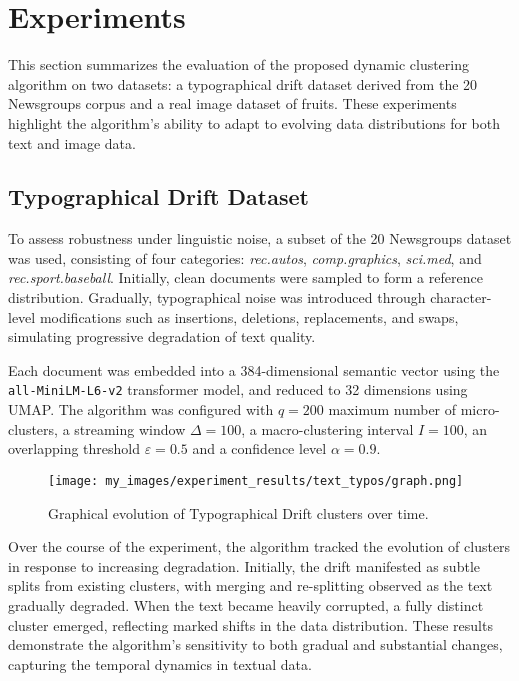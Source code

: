 \section{Experiments}\label{sec:experiments}

This section summarizes the evaluation of the proposed dynamic clustering
algorithm on two datasets: a typographical drift dataset derived from the 20
Newsgroups corpus and a real image dataset of fruits. These experiments
highlight the algorithm's ability to adapt to evolving data distributions for
both text and image data.

\subsection{Typographical Drift Dataset}\label{subsec:typographical_drift}

To assess robustness under linguistic noise, a subset of the 20 Newsgroups
dataset was used, consisting of four categories: \emph{rec.autos},
\emph{comp.graphics}, \emph{sci.med}, and \emph{rec.sport.baseball}. Initially,
clean documents were sampled to form a reference distribution. Gradually,
typographical noise was introduced through character-level modifications such
as insertions, deletions, replacements, and swaps, simulating progressive
degradation of text quality.

Each document was embedded into a 384-dimensional semantic vector using the
\texttt{all-MiniLM-L6-v2} transformer model, and reduced to 32 dimensions using
UMAP. The algorithm was configured with $q=200$ maximum number of
micro-clusters, a streaming window $\Delta=100$, a macro-clustering interval
$I=100$, an overlapping threshold $\varepsilon=0.5$ and a confidence level
$\alpha=0.9$.



\begin{figure}[H]
    \centering
    \texttt{[image: my\_images/experiment\_results/text\_typos/graph.png]}
    \caption{Graphical evolution of Typographical Drift clusters over time.}
\end{figure}

Over the course of the experiment, the algorithm tracked the evolution of
clusters in response to increasing degradation. Initially, the drift manifested as
subtle splits from existing clusters, with merging and re-splitting observed as
the text gradually degraded. When the text became heavily corrupted, a fully
distinct cluster emerged, reflecting marked shifts in the data
distribution. These results demonstrate the algorithm's sensitivity to both
gradual and substantial changes, capturing the temporal dynamics in textual
data.

